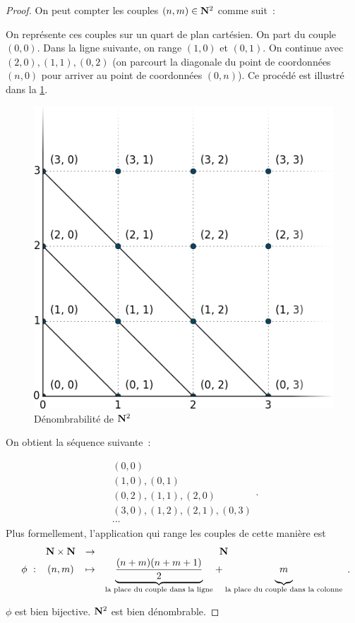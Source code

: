 \documentclass[a4paper,french,final]{memoir}
\begin{document}
\begin{proof}
	On peut compter les couples $(n,m) \in \mathbf{N}^2$ comme suit~: \par On représente ces couples sur un quart de plan cartésien.
	On part du couple $(0, 0)$. Dans la ligne suivante, on range $(1,0) $ et $(0,1)$. On continue avec $(2,0), (1,1), (0,2)$ (on parcourt la diagonale du point de coordonnées $(n,0)$ pour arriver au point de coordonnées $(0,n)$). Ce procédé est illustré dans la  \cref{fig:n_croix_n}.
	\begin{figure}[htb]
		\centering
		\includegraphics[scale=0.3]{n_croix_n.png}
		\caption{Dénombrabilité de $\mathbf{N}^2$}
		\label{fig:n_croix_n}
	\end{figure}

	On obtient la séquence suivante~:

	\[\begin{array}{l}
		(0,0) \\
		(1,0), (0,1) \\
		(0,2), (1,1), (2,0) \\
		(3,0), (1,2), (2,1), (0,3) \\
		\cdots
	\end{array}.\]
	Plus formellement, l'application qui range les couples de cette manière est
	\[\begin{array}{cccc}
		\ & \NN \times \NN & \to & \NN \\
		\phi~: & (n,m) & \mapsto & {\underbrace{\frac{(n+m)(n+m+1)}{2}}_{\text{la place du couple dans la ligne}}} +  {\underbrace{\vphantom{\frac{(n+m)(n+m+1)}{2}} m}_{\text{la place du couple dans la colonne}}}
	\end{array}.\]


	$\phi$ est bien bijective. $\mathbf{N}^2$ est bien dénombrable.
\end{proof}
\end{document}
